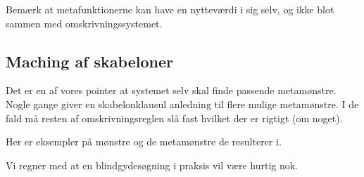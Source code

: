 Bemærk at metafunktionerne kan have en nytteværdi i sig selv, og ikke blot
sammen med omskrivningssystemet.


\subsection{Maching af skabeloner}






Det er en af vores pointer at systemet selv skal finde passende
metamønstre. Nogle gange giver en skabelonklausul anledning til flere
mulige metamønstre. I de fald må resten af omskrivningsreglen slå fast hvilket
der er rigtigt (om noget).

Her er eksempler på mønstre og de metamønstre de resulterer i.

Vi regner med at en blindgydesøgning i praksis vil være hurtig nok.

